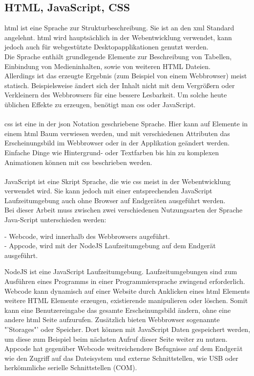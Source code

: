 \documentclass[11pt]{scrartcl}
\begin{document}
\subsection{HTML, JavaScript, CSS}
\ac{html} ist eine Sprache zur Strukturbeschreibung. Sie ist an den \ac{xml} Standard angelehnt. \ac{html}
wird hauptsächlich in der Webentwicklung verwendet, kann jedoch auch für webgestützte Desktopapplikationen
genutzt werden.\\
Die Sprache enthält grundlegende Elemente zur Beschreibung von Tabellen, Einbindung von Medieninhalten, sowie
von weiteren HTML Dateien.\\
Allerdings ist das erzeugte Ergebnis (zum Beispiel von einem Webbrowser) meist statisch. Beispielsweise ändert sich
der Inhalt nicht mit dem Vergrößern oder Verkleinern des Webbrowsers für eine bessere Lesbarkeit. Um solche heute
üblichen Effekte zu erzeugen, benötigt man \ac{css} oder JavaScript.\\
\\
\ac{css} ist eine in der \ac{json} Notation geschriebene Sprache. Hier kann auf Elemente in einem \ac{html} Baum
verwiesen werden, und mit verschiedenen Attributen das Erscheinungsbild im Webbrowser oder in der Applikation
geändert werden.\\
Einfache Dinge wie Hintergrund- oder Textfarben bis hin zu komplexen Animationen können mit \ac{css} beschrieben
werden.\\
\\
JavaScript ist eine Skript Sprache, die wie \ac{css} meist in der Webentwicklung verwendet wird. Sie kann jedoch
mit einer entsprechenden JavaScript Laufzeitumgebung auch ohne Browser auf Endgeräten ausgeführt werden.\\
Bei dieser Arbeit muss zwischen zwei verschiedenen Nutzungsarten der Sprache Java-Script unterschieden werden:\\
\begin{addmargin}[2em]{0em}
 - Webcode, wird innerhalb des Webbrowsers augeführt.\\
 - Appcode, wird mit der NodeJS Laufzeitumgebung auf dem Endgerät ausgeführt.\\
\end{addmargin}
NodeJS ist eine JavaScript Laufzeitumgebung. Laufzeitumgebungen sind zum Ausführen eines Programms in einer
Programmiersprache zwingend erforderlich.\\
Webcode kann dynamisch auf einer Website durch Anklicken eines \ac{html} Elements weitere HTML Elemente erzeugen,
existierende manipulieren oder löschen. Somit kann eine Benutzereingabe das gesamte Erscheinungsbild ändern,
ohne eine andere \ac{html} Seite aufzurufen.
Zusätzlich bieten Webbrowser sogenannte "'Storages"' oder Speicher. Dort können mit JavaScript Daten gespeichert werden,
um diese zum Beispiel beim nächsten Aufruf dieser Seite weiter zu nutzen.\\
Appcode hat gegenüber Webcode weitreichendere Befugnisse auf dem Endgerät wie den Zugriff auf das Dateisystem und
externe Schnittstellen, wie USB oder herkömmliche serielle Schnittstellen (COM).
\clearpage
\end{document}
